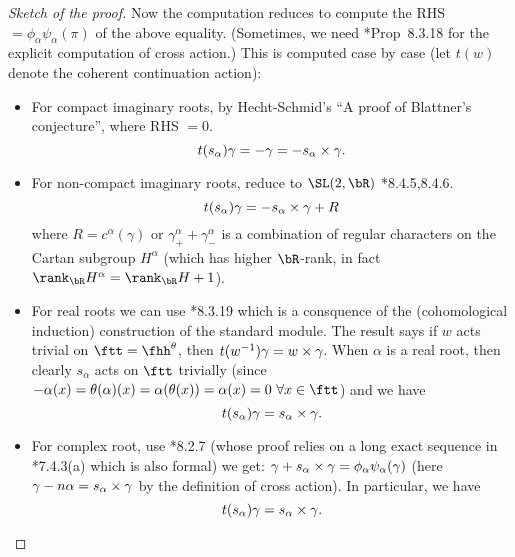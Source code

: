 \documentclass[counting_main.tex]{subfiles}
\begin{document}
\begin{proof}[Sketch of the proof]
{    Now the computation reduces to compute the RHS
    $=\phi_{\alpha} \psi_{\alpha} (\pi)$ of the above equality. (Sometimes, we
    need \cite{Vg}*{Prop~8.3.18} for the explicit computation of cross action.)
    This is computed case by case (let $t(w)$ denote the coherent continuation
    action):
    \begin{itemize}
      \item For compact imaginary roots, by Hecht-Schmid's ``A proof of
      Blattner's conjecture'', where RHS $=0$.
      \[
        t(s_{\alpha}) \gamma = - \gamma = - s_{\alpha}\times \gamma.
      \]
      \item For non-compact imaginary roots, reduce to $\SL(2,\bR)$
      \cite{Vg}*{8.4.5,8.4.6}.
      \[
        t(s_{\alpha}) \gamma = - s_{\alpha}\times \gamma + R
      \]
      where $R = c^{\alpha}(\gamma)$ or
      $\gamma^{\alpha}_{+}+\gamma^{\alpha}_{-}$ is a combination of
      regular characters on the Cartan subgroup $H^{\alpha}$ (which has
      higher $\bR$-rank, in fact
      $\rank_{\bR}H^{\alpha} = \rank_{\bR} H +1$).
      \item For real roots we can use \cite{Vg}*{8.3.19} which is a consquence
      of the (cohomological induction) construction of the standard
      module. The result says if $w$ acts trivial on $\ftt=\fhh^{\theta}$,
      then $t(w^{-1})\gamma = w\times \gamma$. When $\alpha$ is a real
      root, then clearly $s_{\alpha}$ acts on $\ftt$ trivially (since
      $-\alpha(x) = \theta(\alpha)(x) = \alpha(\theta(x)) = \alpha(x) = 0
      \ \forall x\in \ftt$)
      and we have
      \[
        t(s_{\alpha}) \gamma = s_{\alpha}\times \gamma.
      \]
      \item For complex root, use \cite{Vg}*{8.2.7} (whose proof relies on a
      long exact sequence in \cite{Vg}*{7.4.3(a)} which is also formal) we get:
      $\gamma + s_{\alpha}\times \gamma = \phi_{\alpha} \psi_{\alpha} (\gamma)$
      (here $\gamma-n\alpha = s_{\alpha}\times \gamma$ by the definition of
      cross action).
      In particular, we have
      \[
        t(s_{\alpha}) \gamma = s_{\alpha}\times \gamma.
      \]
    \end{itemize}
 }


\end{proof}
\end{document}
